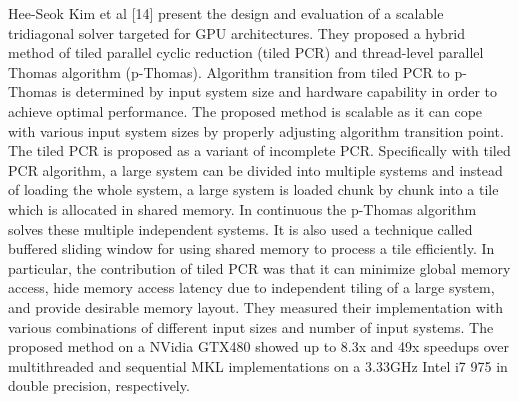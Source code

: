 Hee-Seok Kim et al [14] present the design and evaluation of a scalable tridiagonal solver targeted for GPU architectures. They proposed a hybrid method of tiled parallel cyclic reduction (tiled PCR) and thread-level parallel Thomas algorithm (p-Thomas). Algorithm transition from tiled PCR to p-Thomas is determined by input system size and hardware capability in order to achieve optimal performance. The proposed method is scalable as it can cope with various input system sizes by properly adjusting algorithm transition point. The tiled PCR is proposed as a variant of incomplete PCR. Specifically with tiled PCR algorithm, a large system can be divided into multiple systems and instead of loading the whole system, a large system is loaded chunk by chunk into a tile which is allocated in shared memory. In continuous the p-Thomas algorithm solves these multiple independent systems. It is also used a technique called buffered sliding window for using shared memory to process a tile efficiently. In particular, the contribution of tiled PCR was that it can minimize global memory access, hide memory access latency due to independent tiling of a large system, and provide desirable memory layout. They measured their implementation with various combinations of different input sizes and number of input systems. The proposed method on a NVidia GTX480 showed up to 8.3x and 49x speedups over multithreaded and sequential MKL implementations on a 3.33GHz Intel i7 975 in double precision, respectively.


